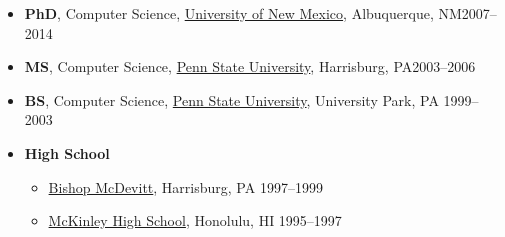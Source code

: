 \documentclass[11pt]{article}
\begin{document}
\begin{itemize}


\item \textbf{PhD}, Computer Science,  \href{https://www.unm.edu}{University of New Mexico}, Albuquerque, NM\hfill 2007--2014
  
\item \textbf{MS}, Computer Science,  \href{https://www.hbg.psu.edu}{Penn State University}, Harrisburg, PA\hfill 2003--2006
  
\item \textbf{BS}, Computer Science, \href{https://www.psu.edu}{Penn State University}, University Park, PA \hfill 1999--2003

\item \textbf{High School}
  \begin{itemize}
  \item \href{https://www.bishopmcdevitt.org/mcd/}{Bishop McDevitt}, Harrisburg, PA \hfill 1997--1999
  \item \href{https://www.mckinley.k12.hi.us/}{McKinley High School}, Honolulu, HI \hfill 1995--1997  
\end{itemize}

  
\end{itemize}
\end{document}
